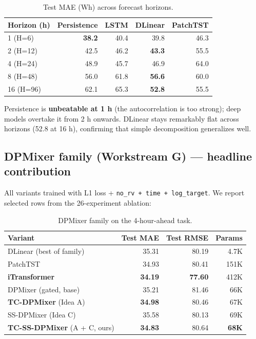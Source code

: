 \documentclass[11pt,letterpaper]{article}
\begin{document}
\begin{table}[H]
\centering
\small
\begin{tabular}{lrrrr}
\toprule
\textbf{Horizon (h)} & \textbf{Persistence} & \textbf{LSTM} & \textbf{DLinear} & \textbf{PatchTST} \\
\midrule
1 (H=6)   & \textbf{38.2} & 40.4 & 39.8          & 46.3 \\
2 (H=12)  & 42.5          & 46.2 & \textbf{43.3} & 55.5 \\
4 (H=24)  & 48.9          & 45.7 & 46.9          & 64.0 \\
8 (H=48)  & 56.0          & 61.8 & \textbf{56.6} & 60.0 \\
16 (H=96) & 62.1          & 65.3 & \textbf{52.8} & 55.5 \\
\bottomrule
\end{tabular}
\caption{Test MAE (Wh) across forecast horizons.}
\end{table}

Persistence is \textbf{unbeatable at 1 h} (the autocorrelation is too
strong); deep models overtake it from 2 h onwards. DLinear stays
remarkably flat across horizons (52.8 at 16 h), confirming that simple
decomposition generalizes well.

\subsection{DPMixer family (Workstream G) --- headline contribution}
\label{sec:dpmixer}

All variants trained with L1 loss + \texttt{no\_rv + time + log\_target}.
We report selected rows from the 26-experiment ablation:

\begin{table}[H]
\centering
\small
\begin{tabular}{lrrr}
\toprule
\textbf{Variant} & \textbf{Test MAE} & \textbf{Test RMSE} & \textbf{Params} \\
\midrule
DLinear (best of family)             & 35.31          & 80.19          & 4.7K \\
PatchTST                             & 34.93          & 80.41          & 151K \\
\textbf{iTransformer}                & \textbf{34.19} & \textbf{77.60} & 412K \\
DPMixer (gated, base)                & 35.21          & 81.46          & 66K  \\
\textbf{TC-DPMixer} (Idea A)         & \textbf{34.98} & 80.46          & 67K  \\
SS-DPMixer (Idea C)                  & 35.58          & 80.13          & 69K  \\
\textbf{TC-SS-DPMixer} (A + C, ours) & \textbf{34.83} & 80.64          & \textbf{68K} \\
\bottomrule
\end{tabular}
\caption{DPMixer family on the 4-hour-ahead task.}
\end{table}
\end{document}
